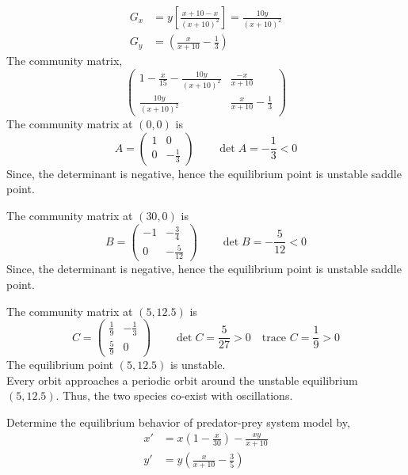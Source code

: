 \documentclass[../main-sheet.tex]{subfiles}
\begin{document}
\begin{soln}
\begin{align*}
        G_x&=y\left[ \frac{x+10-x}{(x+10)^2} \right]=\frac{10y}{(x+10)^2}\\
        G_y&=\left( \frac{x}{x+10}-\frac{1}{3} \right)
    \end{align*}
    The community matrix,
    \[\begin{pmatrix}
        1-\frac{x}{15}-\frac{10y}{(x+10)^2} &\frac{-x}{x+10}\\
        \frac{10y}{(x+10)^2} &\frac{x}{x+10}-\frac{1}{3}
    \end{pmatrix}\]
    The community matrix at \((0,0)\) is 
    \[A=\begin{pmatrix}
        1&0\\
        0&-\frac{1}{3}
    \end{pmatrix}\qquad \det A=-\frac{1}{3}<0\]
    Since, the determinant is negative, hence the equilibrium point is unstable saddle point.

    
    The community matrix at \((30,0)\) is 
    \[B=\begin{pmatrix}
        -1&-\frac{3}{4}\\
        0&-\frac{5}{12}
    \end{pmatrix}\qquad \det B=-\frac{5}{12}<0\]
    Since, the determinant is negative, hence the equilibrium point is unstable saddle point.
    
    The community matrix at \((5,12.5)\) is 
    \[C=\begin{pmatrix}
        \frac{1}{9}&-\frac{1}{3}\\
        \frac{5}{9}&0
    \end{pmatrix}\qquad \det C=\frac{5}{27}>0\quad \text{trace }C=\frac{1}{9}>0\]
    The equilibrium point \((5,12.5)\) is unstable.\\
    Every orbit approaches a periodic orbit around the unstable equilibrium \((5,12.5)\). Thus, the two species co-exist with oscillations.
\end{soln}
\begin{prob}
    Determine the equilibrium behavior of predator-prey system model by,
    \begin{align*}
        x'&=x\left( 1-\frac{x}{30} \right)-\frac{xy}{x+10}\\
        y'&=y\left( \frac{x}{x+10}-\frac{3}{5} \right)
    \end{align*}
\end{prob}
\end{document}
